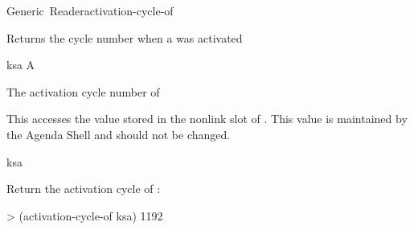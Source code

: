 \documentclass[10pt,twoside,english,pdftex]{article}
\begin{document}
\begin{functiondoc}{Generic~Reader}{activation-cycle-of}{ 
    \returns{} }
%
%

\fnsyntax

\fnpurpose Returns the cycle number when a  was activated

\fnmethods
{}

\fnpackage {}

\fnmodule {}

\fnargs
\begin{args}{ksa}
\arg[ksa] A 
\end{args}

\fnreturns The activation cycle number of 
  
\fndescription 
This  accesses the value stored in the 
 nonlink slot of .  This value is
maintained by the Agenda Shell and should not be changed.

\begin{alsos}{ksa}
\also[ksa]
\end{alsos}

\fnexample
Return the activation cycle of :
%
\W\supp
\begin{example}
> (activation-cycle-of ksa)
1192
\end{example}

\end{functiondoc}

\end{document}
